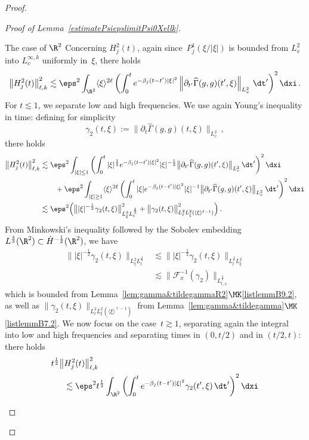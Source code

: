 \begin{proof}
\begin{proof}[{Proof of Lemma~\ref{estimatePsiepslimitPsi0Xellk}}]
\begin{step}{The case of $\R^2$}
Concerning $H^2_j(t)$, again since~$P_{j}^1(\xi/|\xi|)$ is bounded from $L^2_v$ into $L^{\infty,k}_v$ uniformly in~$\xi$, there holds
\[
\left\|H^2_j(t)\right\|^2_{\ell,k} \lesssim\eps^2 \int_{\R^2} \langle \xi \rangle^{2\ell} \left(\int_0^t e^{- \beta_j (t-{t'}) |\xi|^2} \left\| \partial_{t'} \widehat {\Gamma}(g,g)({t'},\xi)\right\|_{L^2_v}\,\dt' \right)^2 \dxi
\,.
\]
For $t \lesssim 1$, we separate low and high frequencies. We use again Young's inequality in time: defining for simplicity
\[
{\gamma_2}({t},\xi) := \| \partial_{t} \widehat {\Gamma}(g,g)(t,\xi) \|_{L^2_v} \,,
\]
there holds
\begin{align*}
\left\|H^2_j(t)\right\|^2_{\ell,k} &\lesssim \eps^2 \int_{|\xi| \le 1} \left(\int_0^t |\xi|^\frac12 e^{- \beta_j (t-{t'}) |\xi|^2} |\xi|^{-\frac12} \big\| \partial_{t'} \widehat {\Gamma}(g,g)({t'},\xi)\big\|_{L^2_v} \, \dt' \right)^2 \dxi \\
&\qquad + \eps^2 \int_{|\xi| \ge 1} \langle \xi \rangle^{2\ell} \left(\int_0^t |\xi| e^{- \beta_j (t-{t'}) |\xi|^2} |\xi|^{-1} \big\| \partial_{t'} \widehat {\Gamma}(g,g)({t'},\xi)\big\|_{L^2_v} \, \dt' \right)^2 \dxi \\
&\lesssim \eps^2 {\Big(\big\| |\xi|^{-\frac12}\gamma_2(t,\xi) \big\|_{L^2_\xi L^\frac43_t} ^2 +\big\| \gamma_2(t,\xi)\big\|^2_{L^2_tL^2_\xi(\langle \xi \rangle^{\ell-1})} \Big)} \,.
\end{align*}
From Minkowski's inequality followed by the Sobolev embedding~$L^\frac43(\R^2)\subset \dot H^{-\frac12}(\R^2)$, we have
\[
\begin{aligned}
\big\| |\xi|^{-\frac12} \gamma_2(t,\xi) \big\|_{L^2_\xi L^\frac43_t} & \lesssim \big\| |\xi|^{-\frac12}\gamma_2(t,\xi)\big\|_{L^\frac43_tL^2_{\xi} }\\
& \lesssim \big\| \mathcal F_x^{-1}(\gamma_2)\|_{L^\frac43_{t,x}}
\end{aligned}
\]
which is bounded from Lemma~\ref{lem:gamma&tildegammaR2}$\MK$\eqref{listlemmB9.2}, as well as {$\big\| \gamma_2(t,\xi)\big\|_{L^2_tL^2_\xi(\langle \xi \rangle^{\ell-1})} $} from Lem\-ma~\ref{lem:gamma&tildegamma}$\MK$\eqref{listlemmB7.2}. We now focus on the case~$t \gtrsim 1$, separating again the integral into low and high frequencies and separating times in $(0,t/2)$ and in $(t/2,t)$: there holds
\begin{align*}
{t^\frac12}\big\|&H^2_j(t)\big\|^2_{\ell,k} \\
& \lesssim \eps^2 {t^\frac12}\int_{\R^2} \left(\int_0^t e^{-\beta_j(t-{t'})|\xi|^2}{\gamma_2}({t'},\xi) \, \dt' \right)^2 \dxi \\

\end{align*}
\end{step}
\end{proof}
\end{proof}
